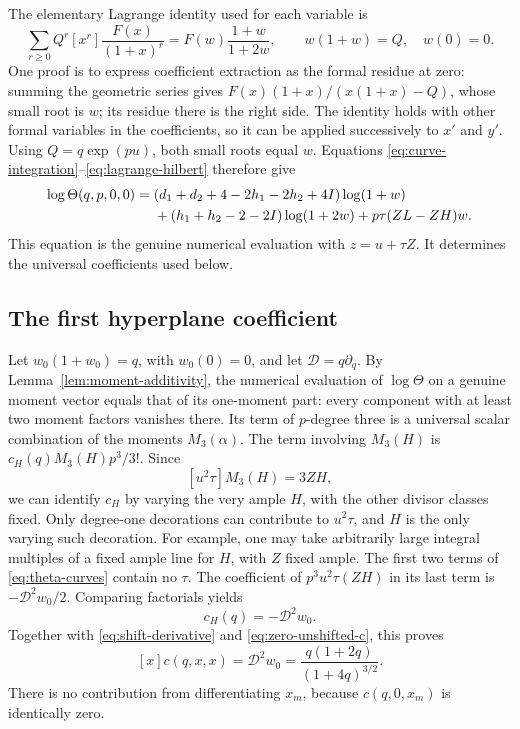 The elementary Lagrange identity used for each variable is
\begin{equation}\label{eq:lagrange-hilbert}
 \sum_{r\geq0}Q^r [x^r]\frac{F(x)}{(1+x)^r}
 =F(w)\frac{1+w}{1+2w},
 \qquad w(1+w)=Q,\quad w(0)=0.
\end{equation}
One proof is to express coefficient extraction as the formal residue
at zero: summing the geometric series gives
\(F(x)(1+x)/(x(1+x)-Q)\), whose small root is \(w\);
its residue there is the right side.
The identity holds with other formal variables in the coefficients,
so it can be applied successively to \(x'\) and \(y'\).
Using \(Q=q\exp(pu)\), both small roots equal \(w\).
Equations \eqref{eq:curve-integration}--\eqref{eq:lagrange-hilbert}
therefore give
\begin{align}
 \log\Theta(q,p,0,0)
 ={}&
 (d_1+d_2+4-2h_1-2h_2+4I)\log(1+w) \notag\\
 &+(h_1+h_2-2-2I)\log(1+2w)
   +p\tau(ZL-ZH)w .
 \label{eq:theta-curves}
\end{align}
This equation is the genuine numerical evaluation with
\(z=u+\tau Z\). It determines the universal coefficients used below.

\subsection{The first hyperplane coefficient}

Let \(w_0(1+w_0)=q\), with \(w_0(0)=0\), and let
\(\mathcal D=q\partial_q\).
By Lemma~\ref{lem:moment-additivity}, the numerical evaluation of
\(\log\Theta\) on a genuine moment vector equals that of its
one-moment part: every component with at least two moment factors
vanishes there. Its term of \(p\)-degree three is a universal scalar
combination of the moments \(M_3(\alpha)\). The term involving
\(M_3(H)\) is \(c_H(q)M_3(H)p^3/3!\).
Since
\[
 [u^2\tau]M_3(H)=3ZH,
\]
we can identify \(c_H\) by varying the very ample \(H\), with the
other divisor classes fixed. Only degree-one decorations can
contribute to \(u^2\tau\), and \(H\) is the only varying such
decoration. For example, one may take arbitrarily large integral
multiples of a fixed ample line for \(H\), with \(Z\) fixed ample.
The first two terms of \eqref{eq:theta-curves} contain no \(\tau\).
The coefficient of \(p^3u^2\tau(ZH)\) in its last term is
\(-\mathcal D^2w_0/2\). Comparing factorials yields
\[
 c_H(q)=-\mathcal D^2w_0.
\]
Together with \eqref{eq:shift-derivative} and
\eqref{eq:zero-unshifted-c}, this proves
\begin{equation}\label{eq:first-c-coefficient}
 [x]c(q,x,x)
 =\mathcal D^2w_0
 =\frac{q(1+2q)}{(1+4q)^{3/2}}.
\end{equation}
There is no contribution from differentiating \(x_m\), because
\(c(q,0,x_m)\) is identically zero.

